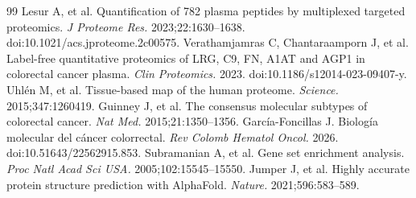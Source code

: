 \documentclass[11pt]{article}
\begin{document}
\begin{thebibliography}{99}
 Lesur A, et al. Quantification of 782 plasma peptides by multiplexed targeted proteomics. \textit{J Proteome Res.} 2023;22:1630--1638. doi:10.1021/acs.jproteome.2c00575.
 Verathamjamras C, Chantaraamporn J, et al. Label-free quantitative proteomics of LRG, C9, FN, A1AT and AGP1 in colorectal cancer plasma. \textit{Clin Proteomics.} 2023. doi:10.1186/s12014-023-09407-y.
 Uhlén M, et al. Tissue-based map of the human proteome. \textit{Science.} 2015;347:1260419.
 Guinney J, et al. The consensus molecular subtypes of colorectal cancer. \textit{Nat Med.} 2015;21:1350--1356.
 García-Foncillas J. Biología molecular del cáncer colorrectal. \textit{Rev Colomb Hematol Oncol.} 2026. doi:10.51643/22562915.853.
 Subramanian A, et al. Gene set enrichment analysis. \textit{Proc Natl Acad Sci USA.} 2005;102:15545--15550.
 Jumper J, et al. Highly accurate protein structure prediction with AlphaFold. \textit{Nature.} 2021;596:583--589.
\end{thebibliography}
\end{document}
